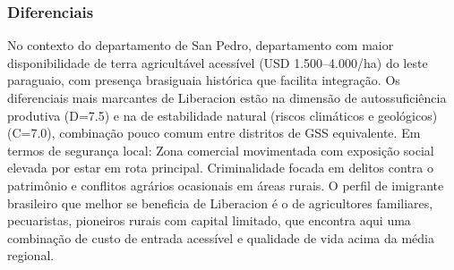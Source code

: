 \subsubsection*{Diferenciais}\label{dif-liberacion-0220}
No contexto do departamento de San Pedro, departamento com maior disponibilidade de terra agricultável acessível (USD 1.500–4.000/ha) do leste paraguaio, com presença brasiguaia histórica que facilita integração. Os diferenciais mais marcantes de Liberacion estão na dimensão de autossuficiência produtiva (D=7.5) e na de estabilidade natural (riscos climáticos e geológicos) (C=7.0), combinação pouco comum entre distritos de GSS equivalente. Em termos de segurança local: Zona comercial movimentada com exposição social elevada por estar em rota principal. Criminalidade focada em delitos contra o patrimônio e conflitos agrários ocasionais em áreas rurais. O perfil de imigrante brasileiro que melhor se beneficia de Liberacion é o de agricultores familiares, pecuaristas, pioneiros rurais com capital limitado, que encontra aqui uma combinação de custo de entrada acessível e qualidade de vida acima da média regional.
